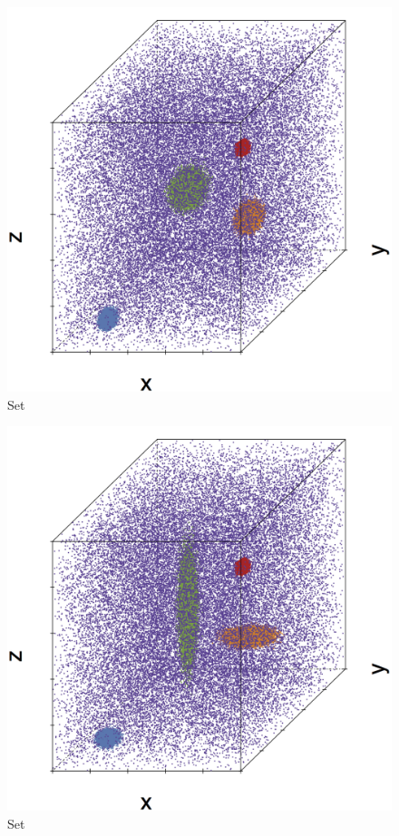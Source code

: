 \begin{subfigure}{0.23\textwidth}
	\centering
	\includegraphics[width=\textwidth]{3/img/datasetplot_ferdosi_3_120000.png}
	\caption{Set \ferdosiThree}
	\label{fig:3:simulated:datasets:ferdosi3}
\end{subfigure}			
\begin{subfigure}{0.23\textwidth}
	\centering
	\includegraphics[width=\textwidth]{3/img/datasetplot_baakman_3_120000.png}
	\caption{Set \baakmanThree}
	\label{fig:3:simulated:datasets:baakman3}
\end{subfigure}